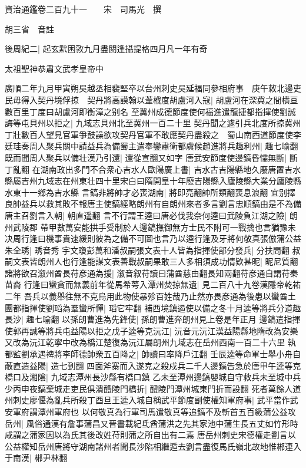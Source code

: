 資治通鑑卷二百九十一　　宋　司馬光　撰

胡三省　音註

後周紀二|{
	起玄黓困敦九月盡閼逢攝提格四月凡一年有奇}


太祖聖神恭肅文武孝皇帝中

廣順二年九月甲寅朔吳越丞相裴堅卒以台州刺史吳延福同參相府事　庚午敇北邊吏民毋得入契丹境俘掠　契丹將高謨翰以葦栰度胡盧河入寇|{
	胡盧河在深冀之間横亘數百里丁度曰胡盧河即衡漳之别名}
至冀州成德節度使何福進遣龍捷都指揮使劉誠誨等屯貝州以拒之|{
	九域志貝州北至冀州一百二十里}
契丹聞之遽引兵北度所掠冀州丁壯數百人望見官軍爭鼓譟欲攻契丹官軍不敢應契丹盡殺之　蜀山南西道節度使李廷珪奏周人聚兵關中請益兵為備蜀主遣奉鑾肅衛都虞候趙進將兵趣利州|{
	趣七喻翻}
既而聞周人聚兵以備壮漢乃引還|{
	還從宣翻又如字}
唐武安節度使邊鎬昏懦無斷|{
	斷丁亂翻}
在湖南政出多門不合衆心吉水人歐陽廣上書|{
	吉水古吉陽縣地久廢唐置吉水縣屬吉州九域志在州東壮四十里宋白曰隋開皇十年廢吉陽縣入廬陵縣大業分廬陵縣水東十一鄉為吉水縣}
言鎬非將帥才必喪湖南|{
	將即亮翻帥所類翻喪息浪翻}
宜别擇良帥益兵以救其敗不報唐主使鎬經略朗州有自朗州來者多言劉言忠順鎬由是不為備唐主召劉言入朝|{
	朝直遥翻}
言不行謂王逵曰唐必伐我奈何逵曰武陵負江湖之險|{
	朗州武陵郡}
帶甲數萬安能拱手受制於人邊鎬撫御無方士民不附可一戰擒也言猶豫未决周行逢曰機事貴速緩則彼為之備不可圖也言乃以逵行逢及牙將何敬真張倣蒲公益朱全琇|{
	琇音秀}
宇文瓊彭萬和潘叔嗣張文表十人皆為指揮使部分發兵|{
	分扶問翻}
叔嗣文表皆朗州人也行逢能謀文表善戰叔嗣果敢三人多相須成功情欵甚昵|{
	昵尼質翻}
諸將欲召溆州酋長苻彦通為援|{
	溆音叙苻讀曰蒲酋慈由翻長知兩翻苻彦通自謂苻秦苗裔}
行逢曰蠻貪而無義前年從馬希萼入潭州焚掠無遺|{
	見二百八十九卷漢隱帝乾祐二年}
吾兵以義舉往無不克烏用此物使暴殄百姓哉乃止然亦畏彦通為後患以蠻酋土團都指揮使劉瑫為羣蠻所憚|{
	瑫它牢翻}
補西境鎮遏使以備之冬十月逵等將兵分道趣長沙|{
	趣七喻翻}
以孫朗曹進為先鋒使|{
	孫朗曹進奔朗州見上卷是年正月}
邊鎬遣指揮使郭再誠等將兵屯益陽以拒之戊子逵等克沅江|{
	沅音元沅江漢益陽縣地隋改為安樂又改為沅江乾寧中改為橋江楚復為沅江屬朗州九域志在岳州西南一百二十六里}
執都監劉承遇禆將李師德帥衆五百降之|{
	帥讀曰率降戶江翻}
壬辰逵等命軍士舉小舟自蔽直造益陽|{
	造七到翻}
四面斧寨而入遂克之殺戍兵二千人邊鎬告急於唐甲午逵等克橋口及湘隂|{
	九域志潭州長沙縣有橋口鎮}
乙未至潭州邊鎬嬰城自守救兵未至城中兵少丙申夜鎬棄城走吏民俱潰醴陵門橋折|{
	醴陵門潭州城東門折而設翻}
死者萬餘人道州刺史廖偃為亂兵所殺丁酉旦王逵入城自稱武平節度副使權知軍府事|{
	武平當作武安軍府謂潭州軍府也}
以何敬真為行軍司馬遣敬真等追鎬不及斬首五百級蒲公益攻岳州|{
	風俗通漢有詹事蒲昌又晉書載紀氐酋蒲洪之先其家池中蒲生長五丈如竹形時咸謂之蒲家因以為氏其後改姓苻則蒲之所自出有二焉}
唐岳州刺史宋德權走劉言以公益權知岳州唐將守湖南諸州者聞長沙陷相繼遁去劉言盡復馬氏嶺北故地惟郴連入于南漢|{
	郴尹林翻}
